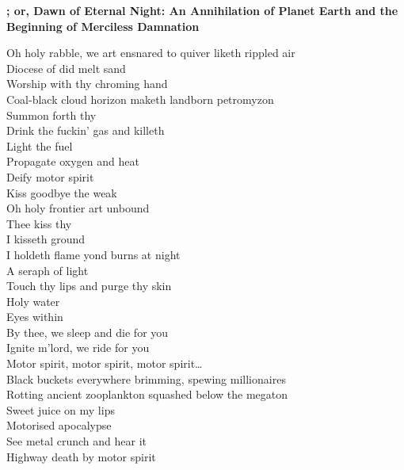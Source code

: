 \vspace*{-.5\baselineskip}%
\textbf{; or, Dawn of Eternal Night: An Annihilation of Planet Earth and the Beginning of Merciless Damnation}
\label{album:petrodragonic-apocalypse}



Oh holy rabble, we art ensnared to quiver liketh rippled air \\
Diocese of did melt sand \\
Worship with thy chroming hand \\
Coal-black cloud horizon maketh landborn petromyzon \\
Summon forth thy  \\
Drink the fuckin' gas and killeth \\

Light the fuel \\
Propagate oxygen and heat \\
Deify motor spirit \\
Kiss goodbye the weak \\

Oh holy frontier art unbound \\
Thee kiss thy  \\
I kisseth ground \\
I holdeth flame yond burns at night \\
A seraph of  light \\
Touch thy lips and purge thy skin \\
Holy water \\
Eyes within \\
By thee, we sleep and die for you \\
Ignite m'lord, we ride for you \\

Motor spirit, motor spirit, motor spirit… \\

Black buckets everywhere brimming, spewing millionaires \\
Rotting ancient zooplankton squashed below the megaton \\
Sweet juice on my lips \\
Motorised apocalypse \\
See metal crunch and hear it \\
Highway death by motor spirit \\

